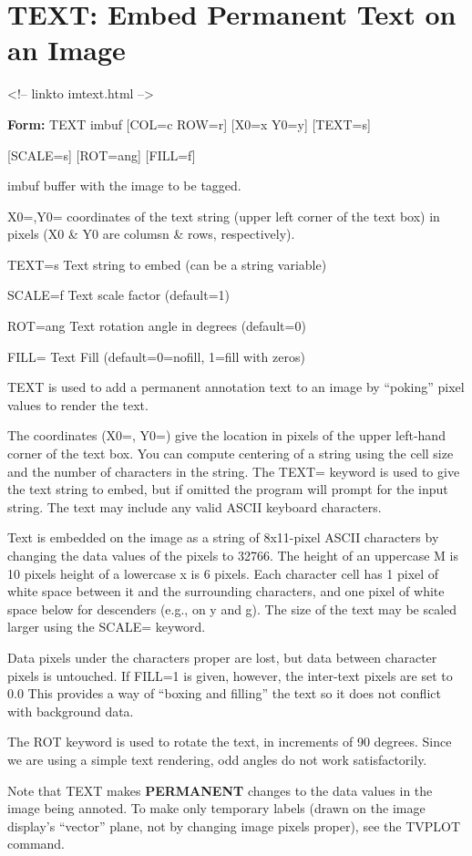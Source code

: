 \section{TEXT: Embed Permanent Text on an Image}
\begin{rawhtml}
<!-- linkto imtext.html -->
\end{rawhtml}
\begin{command}
  \item[\textbf{Form: }TEXT  imbuf {[COL=c ROW=r]} {[X0=x Y0=y]} 
       {[TEXT=s]}\hfill]{}
  \item[]{{[SCALE=s]} {[ROT=ang]} {[FILL=f]}}
  \item[imbuf]{   buffer with the image to be tagged.}
  \item[X0=,Y0=]{coordinates of the text string (upper left corner of
       the text box) in pixels (X0 \& Y0 are columsn \& rows, respectively).}
  \item[TEXT=s]{Text string to embed (can be a string variable)}
  \item[SCALE=f]{Text scale factor (default=1)}
  \item[ROT=ang]{Text rotation angle in degrees (default=0)}
  \item[FILL=]  {Text Fill (default=0=nofill, 1=fill with zeros)}
\end{command}

TEXT is used to add a permanent annotation text to an image by ``poking''
pixel values to render the text.

The coordinates (X0=, Y0=) give the location in pixels of the upper
left-hand corner of the text box.  You can compute centering of a string
using the cell size and the number of characters in the string.  The TEXT=
keyword is used to give the text string to embed, but if omitted the
program will prompt for the input string.  The text may include any valid
ASCII keyboard characters.

Text is embedded on the image as a string of 8x11-pixel ASCII characters by
changing the data values of the pixels to 32766.  The height of an
uppercase M is 10 pixels height of a lowercase x is 6 pixels.  Each
character cell has 1 pixel of white space between it and the surrounding
characters, and one pixel of white space below for descenders (e.g., on y
and g).  The size of the text may be scaled larger using the SCALE=
keyword.

Data pixels under the characters proper are lost, but data between
character pixels is untouched.  If FILL=1 is given, however, the inter-text
pixels are set to 0.0 This provides a way of ``boxing and filling'' the
text so it does not conflict with background data.

The ROT keyword is used to rotate the text, in increments of 90 degrees.
Since we are using a simple text rendering, odd angles do not work
satisfactorily.

Note that TEXT makes \textbf{PERMANENT} changes to the data values in the
image being annoted.   To make only temporary labels (drawn on the image
display's ``vector'' plane, not by changing image pixels proper), see the
TVPLOT command.

